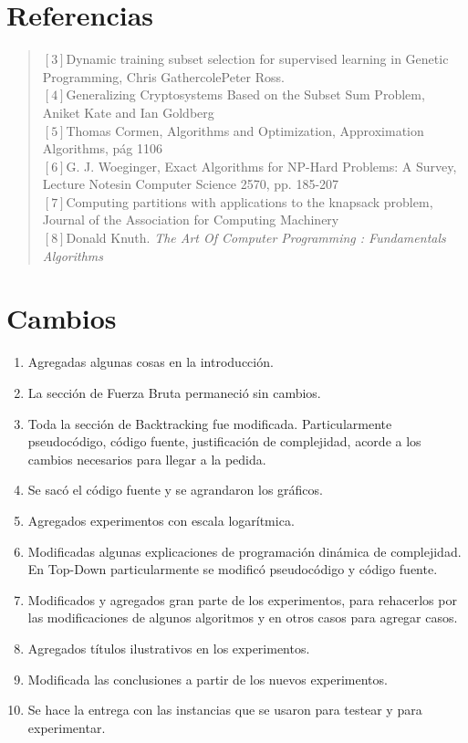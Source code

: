 \documentclass[8pt,a4paper]{article}
\begin{document}
\section{Referencias}
\begin{verse}
$[3]$Dynamic training subset selection for supervised learning in Genetic Programming, Chris GathercolePeter Ross.\\
$[4]$Generalizing Cryptosystems Based on the Subset Sum Problem, Aniket Kate and Ian Goldberg\\
$[5]$Thomas Cormen, Algorithms and Optimization, Approximation Algorithms, pág 1106\\
$[6]$G. J. Woeginger, Exact Algorithms for NP-Hard Problems: A Survey, Lecture Notesin Computer Science 2570, pp. 185-207  \\
$[7]$Computing partitions with applications to the knapsack problem,  Journal of the Association for Computing Machinery\\
$[8]$Donald Knuth. \it{The Art Of Computer Programming : Fundamentals Algorithms}
\end{verse}
\section{Cambios}
\begin{enumerate}
\item Agregadas algunas cosas en la introducción.
\item La sección de Fuerza Bruta permaneció sin cambios.
\item Toda la sección de Backtracking fue modificada. Particularmente pseudocódigo, código fuente, justificación de complejidad, acorde a los cambios necesarios para llegar a la pedida. 
\item Se sacó el código fuente y se agrandaron los gráficos.
\item Agregados experimentos con escala logarítmica.
\item Modificadas algunas explicaciones de programación dinámica de complejidad. En Top-Down particularmente se modificó pseudocódigo y código fuente.
\item Modificados y agregados gran parte de los experimentos, para rehacerlos por las modificaciones de algunos algoritmos y en otros casos para agregar casos.
\item Agregados títulos ilustrativos en los experimentos.
\item Modificada las conclusiones a partir de los nuevos experimentos.
\item Se hace la entrega con las instancias que se usaron para testear y para experimentar.
\end{enumerate}
\end{document}
